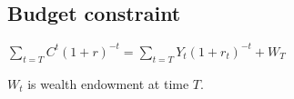 
\subsection{Budget constraint}

\(\sum_{t=T}C^t(1+r)^{-t}=\sum_{t=T}Y_t(1+r_t)^{-t}+W_T\)

\(W_t\) is wealth endowment at time \(T\).


